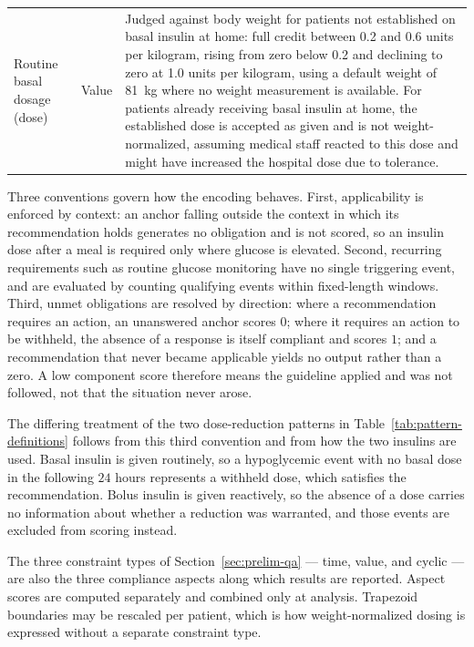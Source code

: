 \begin{longtable}{
>{\raggedright\arraybackslash}p{}
>{\raggedright\arraybackslash}p{}
>{\raggedright\arraybackslash}p{}
}
Routine basal dosage (dose) & Value &
Judged against body weight for patients not established on basal insulin at home: full credit between 0.2 and 0.6 units per kilogram, rising from zero below 0.2 and declining to zero at 1.0 units per kilogram, using a default weight of 81~kg where no weight measurement is available. For patients already receiving basal insulin at home, the established dose is accepted as given and is not weight-normalized, assuming medical staff reacted to this dose and might have increased the hospital dose due to tolerance. \\
\end{longtable}
\endgroup


Three conventions govern how the encoding behaves. First, applicability is enforced by context: an anchor falling outside the context in which its recommendation holds generates no obligation and is not scored, so an insulin dose after a meal is required only where glucose is elevated. Second, recurring requirements such as routine glucose monitoring have no single triggering event, and are evaluated by counting qualifying events within fixed-length windows. Third, unmet obligations are resolved by direction: where a recommendation requires an action, an unanswered anchor scores $0$; where it requires an action to be withheld, the absence of a response is itself compliant and scores $1$; and a recommendation that never became applicable yields no output rather than a zero. A low component score therefore means the guideline applied and was not followed, not that the situation never arose.

The differing treatment of the two dose-reduction patterns in Table~\ref{tab:pattern-definitions} follows from this third convention and from how the two insulins are used. Basal insulin is given routinely, so a hypoglycemic event with no basal dose in the following $24$ hours represents a withheld dose, which satisfies the recommendation. Bolus insulin is given reactively, so the absence of a dose carries no information about whether a reduction was warranted, and those events are excluded from scoring instead.

The three constraint types of Section~\ref{sec:prelim-qa} --- time, value, and cyclic --- are also the three compliance aspects along which results are reported. Aspect scores are computed separately and combined only at analysis. Trapezoid boundaries may be rescaled per patient, which is how weight-normalized dosing is expressed without a separate constraint type.

